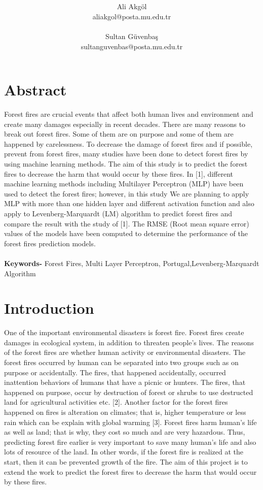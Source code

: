 \documentclass[onecolumn]{article}
\title{\spacecaps{ Using Multilayer Perceptron and Levenberg-Marquardt Algorithm to Predict Forest Fires}\\ \normalsize \spacesc{CENG3521, Data Mining} }
\author{Ali Akgöl\\aliakgol@posta.mu.edu.tr \\\\ Sultan Güvenbaş\\ sultanguvenbas@posta.mu.edu.tr}
\date{}
\begin{document}
\maketitle

\section{Abstract}
Forest fires are crucial events that affect both human lives and environment and create many damages especially in recent decades. There are many reasons to break out forest fires. Some of them are on purpose and some of them are happened by carelessness. To decrease the damage of forest fires and if possible, prevent from forest fires, many studies have been done to detect forest fires by using machine learning methods. The aim of this study is to predict the forest fires to decrease the harm that would occur by these fires. In [1], different machine learning methods including Multilayer Perceptron (MLP) have been used to detect the forest fires; however, in this study We are planning to apply MLP with more than one hidden layer and different activation function and also apply to Levenberg-Marquardt (LM) algorithm to predict forest fires and compare the result with the study of [1]. The RMSE (Root mean square error) values of the models have been computed to determine the performance of the forest fires prediction models.
\\
\\
\textbf{Keywords-} Forest Fires, Multi Layer Perceptron, Portugal,Levenberg-Marquardt Algorithm

\section{Introduction}
One of the important environmental disasters is forest fire. Forest fires create damages in ecological system, in addition to threaten people’s lives. The reasons of the forest fires are whether human activity or environmental disasters. The forest fires occurred by human can be separated into two groups such as on purpose or accidentally. The fires, that happened accidentally, occurred inattention behaviors of humans that have a picnic or hunters. The fires, that happened on purpose, occur by destruction of forest or shrubs to use destructed land for agricultural activities etc. [2]. Another factor for the forest fires happened on fires is alteration on climates; that is, higher temperature or less rain which can be explain with global warming [3]. 
Forest fires harm human’s life as well as land; that is why, they cost so much and are very hazardous. Thus, predicting forest fire earlier is very important to save many human’s life and also lots of resource of the land. In other words, if the forest fire is realized at the start, then it can be prevented growth of the fire.
The aim of this project is to extend the work to predict the forest fires to decrease the harm that would occur by these fires. 
\end{document}
